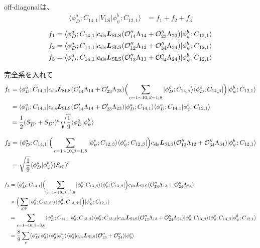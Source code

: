 \documentclass[a4j]{jarticle}
\def\bra{\langle}
\def\ket{\rangle}
\def\calO{{\cal O}}
\def\cbar{\overline{{c}}}
\def\Dbar{\overline{{D}}{}}
\newcommand{\xbld}[1]{\mbox{\boldmath $#1$}}
\def\vecL{{\xbld{L}}}
\def\half#1{\text{${#1\over 2}$}}
\def\Vls{V_\text{LS}}
\def\Lsls{{\vecL_\text{SLS}}}
\begin{document}
off-diagonalは、
\begin{align}
\bra \phi_D^a;C_{14,1}|\Vls|\phi_\psi^b;C_{12,1}\ket&=f_1+f_2+f_3
\end{align}
\begin{align}
f_1&=\bra \phi_D^a;C_{14,1}|c_\text{sls}\Lsls(\calO''_{14}\Lambda_{14}+\calO''_{23}\Lambda_{23})|\phi_\psi^b;C_{12,1}\ket
\\
f_2&=\bra \phi_D^a;C_{14,1}|c_\text{sls}\Lsls(\calO''_{12}\Lambda_{12}+\calO''_{34}\Lambda_{34})|\phi_\psi^b;C_{12,1}\ket
\\
f_3&=\bra \phi_D^a;C_{14,1}|c_\text{sls}\Lsls(\calO''_{13}\Lambda_{13}+\calO''_{24}\Lambda_{24})|\phi_\psi^b;C_{12,1}\ket
\end{align}

完全系を入れて
\begin{align}
f_1&=\bra \phi_D^a;C_{14,1}|c_\text{sls}\Lsls(\calO'_{14}\Lambda_{14}+\calO'_{23}\Lambda_{23})
\Big(\sum_{c=1\sim 10,\beta=1,8}    |\phi_D^c;C_{14,\beta}\ket\bra\phi_D^c;C_{14,\beta}|\Big)
|\phi_\psi^b;C_{12,1}\ket
\nonumber\\
&=\bra \phi_D^a;C_{14,1}|c_\text{sls}\Lsls(\calO'_{14}\Lambda_{14}+\calO'_{23}\Lambda_{23})
|\phi_D^a;C_{14,1}\ket\bra\phi_D^a;C_{14,1}|\phi_\psi^b;C_{12,1}\ket
\\
&=\half1 (S_{\Dbar'}+S_{D'})^a\sqrt{1\over 9}\bra\phi_D^a|\phi_\psi^b\ket 
\end{align}

\begin{align}
f_2&=\bra \phi_D^a;C_{14,1}|
\Big(\sum_{c=1\sim 10,\beta=1,8}    |\phi_\psi^c;C_{12,\beta}\ket\bra\phi_\psi^c;C_{12,\beta}|\Big)
c_\text{sls}\Lsls(\calO''_{12}\Lambda_{12}+\calO''_{34}\Lambda_{34})|\phi_\psi^b;C_{12,1}\ket
\nonumber\\
&=\sqrt{1\over 9}\bra\phi_D^a|\phi_\psi^b\ket (S_{c\cbar})^b
\end{align}

\begin{align}
f_3&=\bra \phi_D^a;C_{14,1}|
\Big(\sum_{c=1\sim 10,\beta=\bar3,6}|\phi_\delta^c;C_{13,\beta}\ket\bra\phi_\delta^c;C_{13,\beta}|\Big)
c_\text{sls}\Lsls(\calO''_{13}\Lambda_{13}+\calO''_{24}\Lambda_{24})
\nonumber\\
&\times\Big(\sum_{d\beta'}|\phi_\delta^d;C_{13,\beta'}\ket\bra\phi_\delta^d;C_{13,\beta'}|\Big)
|\phi_\psi^b;C_{12,1}\ket
\\
&=
\sum_{c=1\sim 10,\beta=\bar3,6}
\bra \phi_D^a;C_{14,1}|\phi_\delta^c;C_{13,\beta}\ket\bra\phi_\delta^c;C_{13,\beta}|
c_\text{sls}\Lsls(\calO''_{13}\Lambda_{13}+\calO''_{24}\Lambda_{24})
|\phi_\delta^c;C_{13,\beta}\ket\bra\phi_\delta^c;C_{13,\beta}
|\phi_\psi^b;C_{12,1}\ket
\\
&={8\over 9}\sum_c\bra\phi_D^a|\phi_\delta^c\ket\bra\phi_\delta^c|\phi_\psi^b\ket 
\bra\phi_\delta^c|c_\text{sls}\Lsls(\calO''_{13}+\calO''_{24})|\phi_\delta^c\ket
\end{align}
\end{document}
